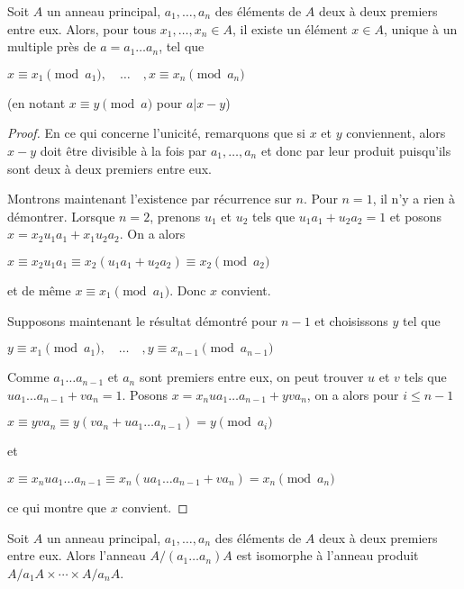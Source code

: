 \begin{thm}
Soit $A$ un anneau principal,
$a_1, \ldots, a_n$
des éléments de $A$ deux à deux premiers entre eux. Alors, pour tous
$x_1, \ldots, x_n \in A$, il existe un élément $x \in A$, unique à un multiple près de $a =
a_1 \ldots a_n$, tel que

$x \equiv x_1 \pmod{a_1}, \quad \ldots \quad , x \equiv x_n \pmod{a_n}$

(en notant $x \equiv y \pmod{a}$ pour
$a | x - y$)
\end{thm}

\begin{proof}
En ce qui concerne l'unicité, remarquons que si $x$ et $y$
conviennent, alors $x - y$ doit être divisible à la fois par
$a_1, \ldots, a_n$
et donc par leur produit puisqu'ils sont deux à deux premiers entre eux.

Montrons maintenant l'existence par récurrence sur $n$. Pour $n = 1$, il n'y
a rien à démontrer. Lorsque $n = 2$, prenons $u_1$ et $u_2$
tels que $u_1 a_1 + u_2 a_2 = 1$ et
posons $x = x_2 u_1 a_1 + x_1 u_2 a_2$. On a alors

$x \equiv x_2 u_1 a_1 \equiv x_2(u_1 a_1 + u_2 a_2) \equiv x_2 \pmod{a_2}$

et de même $x \equiv x_1 \pmod{a_1}$. Donc $x$ convient.

Supposons maintenant le résultat démontré pour $n - 1$ et choisissons $y$
tel que

$y \equiv x_1 \pmod{a_1}, \quad \ldots \quad , y \equiv x_{n-1} \pmod{a_{n-1}}$

Comme
$a_1 \ldots a_{n-1}$
et $a_n$ sont premiers entre eux, on peut trouver $u$ et $v$ tels que
$u a_1 \ldots a_{n-1} + v a_n = 1$. Posons $x = x_n u a_1 \ldots a_{n-1} + y v a_n$, on a alors pour $i \leq n - 1$

$x \equiv y v a_n \equiv y(v a_n + u a_1 \ldots a_{n-1}) = y \pmod{a_i}$

et

$x \equiv x_n u a_1 \ldots a_{n-1} \equiv x_n(u a_1 \ldots a_{n-1} + v a_n) = x_n \pmod{a_n}$

ce qui montre que $x$ convient.
\end{proof}

\begin{cor}
Soit $A$ un anneau principal,
$a_1, \ldots, a_n$
des éléments de $A$ deux à deux premiers entre eux. Alors l'anneau
$A/(a_1 \ldots a_n)A$
est isomorphe à l'anneau produit $A/a_1A \times \cdots \times A/a_nA$.
\end{cor}

